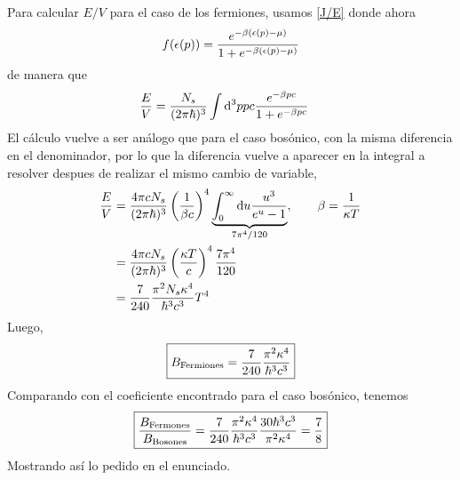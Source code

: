 \begin{sol}
Para calcular $E/V$ para el caso de los fermiones, usamos \eqref{J/E} donde ahora 
\begin{equation}
  f(\epsilon(p))=\frac{e^{-\beta (\epsilon(p)-\mu )}}{1+e^{-\beta (\epsilon(p)-\mu )}}
\end{equation}
de manera que
\begin{align}
  \frac{E}{V}&=\frac{N_s}{(2\pi\hbar)^3}\int\dd^3p pc \frac{e^{-\beta pc}}{1+e^{-\beta pc}}
\end{align}
El cálculo vuelve a ser análogo que para el caso bosónico, con la misma diferencia en el denominador, por lo que la diferencia vuelve a aparecer en la integral a resolver despues de realizar el mismo cambio de variable,
\begin{align}
  \frac{E}{V}&=\frac{4\pi cN_s}{(2\pi\hbar)^3}\left(\frac{1}{\beta c}\right)^4\underbrace{\int_0^\infty \dd u\frac{u^3}{e^{u}-1}}_{7\pi^4/120},\qquad \beta=\frac{1}{\kappa T}\\
  &=\frac{4\pi cN_s}{(2\pi\hbar)^3}\left(\frac{\kappa T}{c}\right)^4\frac{7\pi^4}{120}\\
  &=\frac{7}{240}\frac{\pi^2N_s\kappa^4}{\hbar^3c^3}T^4
\end{align}
Luego,
\begin{equation}
  \boxed{B_{\rm Fermiones}=\frac{7}{240}\frac{\pi^2\kappa^4}{\hbar^3c^3}}
\end{equation}
Comparando con el coeficiente encontrado para el caso bosónico, tenemos
\begin{equation}
  \boxed{\frac{B_{\rm Fermones}}{B_{\rm Bosones}}=\frac{7}{240}\frac{\pi^2\kappa^4}{\hbar^3c^3}\frac{30\hbar^3c^3}{\pi^2\kappa^4}=\frac{7}{8}}
\end{equation}
Mostrando así lo pedido en el enunciado.















\end{sol}